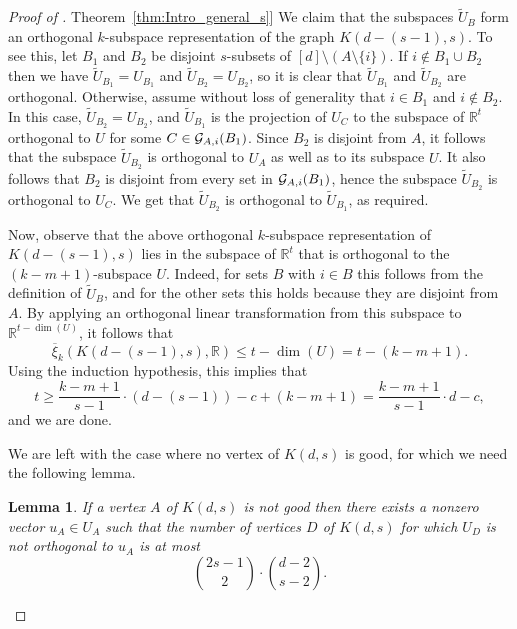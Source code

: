 \documentclass[11pt]{article}
\numberwithin{equation}{section}
\newtheorem{lemma}[theorem]{Lemma}
\theoremstyle{definition}
\theoremstyle{plain}
\newcommand{\R}{\mathbb R}
\newcommand{\expref}[2]{\hyperref[#2]{#1~\ref{#2}}}
\newcommand{\od}{\overline{\xi}}
\newcommand{\calG}{{\cal G}}
\begin{document}
\begin{proof}[Proof of \expref{Theorem}{thm:Intro_general_s}]
We claim that the subspaces $\widetilde{U}_B$ form an orthogonal $k$-subspace representation of the graph $K(d-(s-1),s)$.
To see this, let $B_1$ and $B_2$ be disjoint $s$-subsets of $[d] \setminus (A \setminus \{i\})$.
If $i \notin B_1 \cup B_2$ then we have $\widetilde{U}_{B_1} = U_{B_1}$ and $\widetilde{U}_{B_2} = U_{B_2}$, so it is clear that $\widetilde{U}_{B_1}$ and $\widetilde{U}_{B_2}$ are orthogonal. Otherwise, assume without loss of generality that $i \in B_1$ and $i \notin B_2$. In this case, $\widetilde{U}_{B_2} = U_{B_2}$, and $\widetilde{U}_{B_1}$ is the projection of $U_C$ to the subspace of $\R^t$ orthogonal to $U$ for some $C \in \calG_{A,i}(B_1)$.
Since $B_2$ is disjoint from $A$, it follows that the subspace $\widetilde{U}_{B_2}$ is orthogonal to $U_A$ as well as to its subspace $U$.
It also follows that $B_2$ is disjoint from every set in $\calG_{A,i}(B_1)$, hence the subspace $\widetilde{U}_{B_2}$ is orthogonal to $U_C$. We get that $\widetilde{U}_{B_2}$ is orthogonal to $\widetilde{U}_{B_1}$, as required.

Now, observe that the above orthogonal $k$-subspace representation of $K(d-(s-1),s)$ lies in the subspace of $\R^t$ that is orthogonal to the $(k-m+1)$-subspace $U$.
Indeed, for sets $B$ with $i \in B$ this follows from the definition of $\widetilde{U}_{B}$, and for the other sets this holds because they are disjoint from $A$.
By applying an orthogonal linear transformation from this subspace to $\R^{t-\dim(U)}$, it follows that \[\od_{k}(K(d-(s-1),s),\R) \leq t-\dim(U) = t-(k-m+1).\]
Using the induction hypothesis, this implies that
\[t \geq \frac{k-m+1}{s-1} \cdot (d-(s-1)) -c + (k-m+1)= \frac{k-m+1}{s-1} \cdot d-c,\]
and we are done.

We are left with the case where no vertex of $K(d,s)$ is good, for which we need the following lemma.

\begin{lemma}\label{lemma:bad_vertex}
If a vertex $A$ of $K(d,s)$ is not good then there exists a nonzero vector $u_A \in U_A$ such that the number of vertices $D$ of $K(d,s)$ for which $U_D$ is not orthogonal to $u_A$ is at most
\[\binom{2s-1}{2} \cdot \binom{d-2}{s-2}.\]
\end{lemma}


\end{proof}
\end{document}

